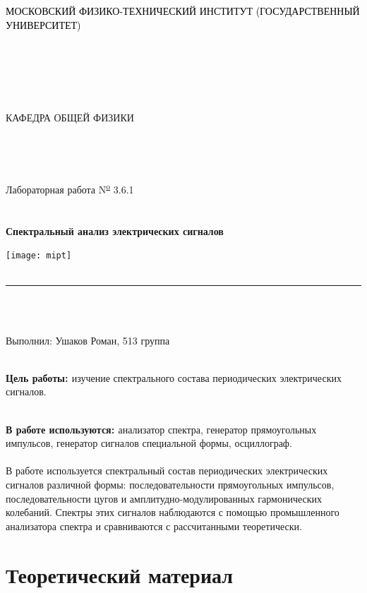 \documentclass[a4paper,12pt]{article}
\newenvironment{bottompar}{\par\vspace*{\fill}}{\clearpage}
\begin{document}

\begin{center}
\textcolor{black}
{
	\large{МОСКОВСКИЙ ФИЗИКО-ТЕХНИЧЕСКИЙ ИНСТИТУТ}
	\large{(ГОСУДАРСТВЕННЫЙ УНИВЕРСИТЕТ)} \\
}

\ \\ 
\ \\
\ \\
\ \\
\ \\
\Large{КАФЕДРА ОБЩЕЙ ФИЗИКИ} \\
\ \\
\ \\
\ \\
\ \\
\large{Лабораторная работа N\textsuperscript{\underline{o}} 3.6.1} \\
\ \\
\large
{
\ \\
\textbf{\Large{Спектральный анализ электрических сигналов}}
}

\graphicspath{{{pictures/}}}
\texttt{[image: mipt]}
\ \\
\ \\
\hrule height 0.5pt depth 1pt
\ \\ 
\begin{bottompar}
\ \\
                              Выполнил: Ушаков Роман, 513 группа \\
\end{bottompar}
\end{center}

\newpage

\ \\
{\bf{Цель работы: }}
 изучение спектрального состава периодических электрических сигналов.

\ \\
{\bf{В работе используются: }}
 анализатор спектра, генератор прямоугольных импульсов, генератор сигналов специальной формы, осциллограф.
\ \\
\ \\
В работе используется спектральный состав периодических электрических сигналов различной формы: последовательности прямоугольных импульсов, последовательности цугов и амплитудно-модулированных гармонических колебаний. Спектры этих сигналов наблюдаются с помощью промышленного анализатора спектра и сравниваются с рассчитанными теоретически.
\section{Теоретический материал}
\end{document}
